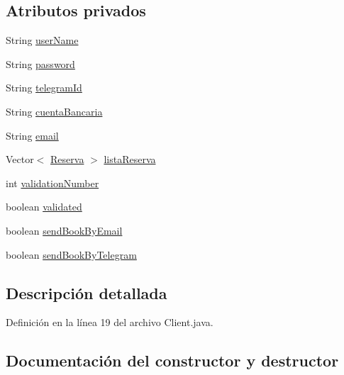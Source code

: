 \subsection*{Atributos privados}
\begin{DoxyCompactItemize}
\item 
String \mbox{\hyperlink{classdomain_1_1_client_a759c4fe989503ceb29bcefca63177186}{user\+Name}}
\item 
String \mbox{\hyperlink{classdomain_1_1_client_ad8c3f3e676480cdf083669c007f1e397}{password}}
\item 
String \mbox{\hyperlink{classdomain_1_1_client_a48de873a69fd65be53e47b2cbb2c309d}{telegram\+Id}}
\item 
String \mbox{\hyperlink{classdomain_1_1_client_a91e08d53a5af62a7822f25c0741b9828}{cuenta\+Bancaria}}
\item 
String \mbox{\hyperlink{classdomain_1_1_client_a47341a6cb46fb5c2c61885669070a939}{email}}
\item 
Vector$<$ \mbox{\hyperlink{classdomain_1_1_reserva}{Reserva}} $>$ \mbox{\hyperlink{classdomain_1_1_client_ae4e6d3d763ee52755c66f199270dd420}{lista\+Reserva}}
\item 
int \mbox{\hyperlink{classdomain_1_1_client_a1127a9cdf4d8ccff666bec1c9db31e95}{validation\+Number}}
\item 
boolean \mbox{\hyperlink{classdomain_1_1_client_a2e70a563bf23fd2be7adc13e997363c8}{validated}}
\item 
boolean \mbox{\hyperlink{classdomain_1_1_client_a7466013d1a12e9d4f7fc739c68bdd238}{send\+Book\+By\+Email}}
\item 
boolean \mbox{\hyperlink{classdomain_1_1_client_a303c59a2c1c521a67583268436f3b951}{send\+Book\+By\+Telegram}}
\end{DoxyCompactItemize}


\subsection{Descripción detallada}


Definición en la línea 19 del archivo Client.\+java.



\subsection{Documentación del constructor y destructor}
\mbox{\label{classdomain_1_1_client_a9e280dad9c4c0e6dbe0f83186afc765a}} 
